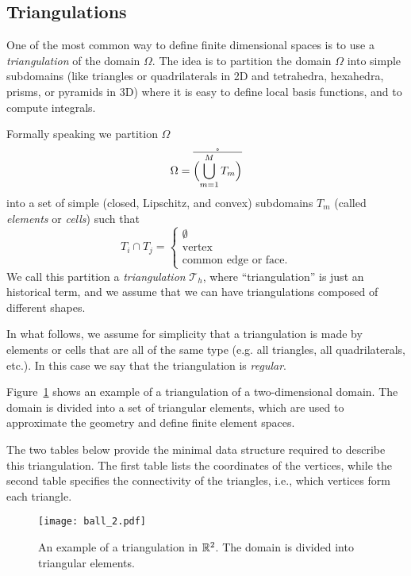 \subsection{Triangulations}

One of the most common way to define finite dimensional spaces is to use a
\emph{triangulation} of the domain $\Omega$. The idea is to partition the domain
$\Omega$ into simple subdomains (like triangles or quadrilaterals in 2D and
tetrahedra, hexahedra, prisms, or pyramids in 3D) where it is easy to define
local basis functions, and to compute integrals.

Formally speaking we partition $\Omega$
\begin{equation*}
\Omega = \mathring{\overline{\Bigl(\bigcup_{m=1}^M T_m \Bigr)}}
\end{equation*}
into a set of simple (closed, Lipschitz, and convex) subdomains $T_m$ (called \emph{elements} or \emph{cells})
such that 
\begin{equation}
T_i \cap T_j = \begin{cases}\emptyset \\ \text{vertex} \\ \text{common edge or face}.\end{cases}
\end{equation}
We call this partition a \emph{triangulation} $\mathcal{T}_h$, where
``triangulation'' is just an historical term, and we assume that we can have
triangulations composed of different shapes.

In what follows, we assume for simplicity that a triangulation is made by
elements or cells that are all of the same type (e.g. all triangles, all
quadrilaterals, etc.). In this case we say that the triangulation is
\emph{regular}.

Figure~\ref{fig:triangulation} shows an example of a triangulation of a two-dimensional domain. The domain is divided into a set of triangular elements, which are used to approximate the geometry and define finite element spaces.

The two tables below provide the minimal data structure required to describe this triangulation. The first table lists the coordinates of the vertices, while the second table specifies the connectivity of the triangles, i.e., which vertices form each triangle.

\begin{figure}[!htb]
\centering
\texttt{[image: ball\_2.pdf]}
\caption{An example of a triangulation in $\mathbb{R}^2$. The domain is divided into triangular elements.}
\label{fig:triangulation}
\end{figure}


